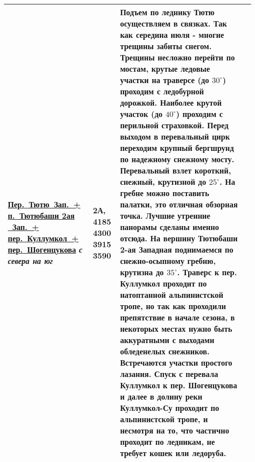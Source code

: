 \begin{longtable}{|>{\centering\arraybackslash}m{4.5cm}|>{\centering\arraybackslash}m{1.8cm}|>{\raggedright\arraybackslash}m{9.6cm}|>{\centering\arraybackslash}m{1.2cm}|}
			\hyperref[subsec:main_obstacles]{{\small Пер.~Тютю~Зап.~+ п.~Тютюбаши 2ая ~Зап.~+ пер.~Куллумкол~+ пер.~Шогенцукова}}	\newline\textit{с севера на юг}			&	2А,	4185 4300 3915 3590		&	{\small Подъем по леднику Тютю осуществляем в связках. Так как середина июля - многие трещины забиты снегом. Трещины несложно перейти по мостам, крутые ледовые участки на траверсе (до $30^\circ$) проходим с ледобурной дорожкой. Наиболее крутой участок (до $40^\circ$) проходим с перильной страховкой. Перед выходом в перевальный цирк переходим крупный бергшрунд по надежному снежному мосту. Перевальный взлет короткий, снежный, крутизной до $25^\circ$. На гребне можно поставить палатки, это отличная обзорная точка. Лучшие утренние панорамы сделаны именно отсюда. На вершину Тютюбаши 2-ая Западная поднимаемся по снежно-осыпному гребню, крутизна до $35^\circ$. Траверс к пер. Куллумкол проходит по натоптанной альпинистской тропе, но так как проходили препятствие в начале сезона, в некоторых местах нужно быть аккуратными с выходами обледенелых снежников. Встречаются участки простого лазания. Спуск с перевала Куллумкол к пер. Шогенцукова и далее в долину реки Куллумкол-Су проходит по альпинистской тропе, и несмотря на то, что частично проходит по ледникам, не требует кошек или ледоруба.}																																																															&			\\ \hline
		\end{longtable}
		

